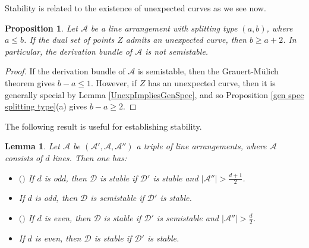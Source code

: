 \documentclass[12pt]{amsart}
\numberwithin{equation}{section}
\newtheorem{proposition}[theorem]{Proposition}
\newtheorem{lemma}[theorem]{Lemma}
\theoremstyle{definition}
\begin{document}
Stability is related to the existence of unexpected curves as we see now. 

\begin{proposition}
   \label{prop:unexpected, so unstable}
Let ${\mathcal{A}}$ be a line arrangement with splitting type $(a, b)$, where $a \le b$.  If the dual set of points $Z$ admits an unexpected curve, then $b \ge a + 2$. In particular, the derivation bundle of ${\mathcal{A}}$ is not semistable.     
\end{proposition}

\begin{proof}
If the derivation bundle of ${\mathcal{A}}$ is semistable, then the Grauert-M\"ulich theorem \cite{GM} gives $b - a \le 1$. However, if $Z$ has an unexpected curve, then it is generally special by Lemma \ref{UnexpImpliesGenSpec},  and so  Proposition \ref{gen spec splitting type}(a) gives $b - a \ge 2$. 
\end{proof} 

The following result is useful for establishing stability. 

\begin{lemma}
           \label{hal thm}
Let $\mathcal A$ be $(\mathcal A', \mathcal A, \mathcal A'')$ a triple of line arrangements, where ${\mathcal{A}}$ consists of $d$ lines.  Then one has: 

\begin{itemize}

\item[(a)] $(${\cite[Theorem 4.5(a)] {hal}}$)$ If $d$ is odd, then $\mathcal D$ is stable if $\mathcal D'$ is stable and $|\mathcal A''| > \frac{d+1}{2}$.

\item[(b)] If $d$ is odd, then $\mathcal D$ is semistable if $\mathcal D'$ is stable.  

\item[(c)] $($\cite[Theorem 4.5(c)] {hal}$)$ If $d$ is even, then $\mathcal D$ is stable if $\mathcal D'$ is semistable and $|\mathcal A''| > \frac{d}{2}$. 

\item[(d)] If $d$ is even, then $\mathcal D$ is stable if $\mathcal D'$ is stable. 

\end{itemize}

\end{lemma} 
\end{document}
